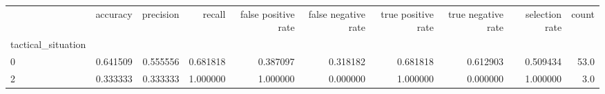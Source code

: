 \begin{tabular}{lrrrrrrrrr}
\toprule
{} &  accuracy &  precision &    recall &  false positive rate &  false negative rate &  true positive rate &  true negative rate &  selection rate &  count \\
tactical\_situation &           &            &           &                      &                      &                     &                     &                 &        \\
\midrule
0                  &  0.641509 &   0.555556 &  0.681818 &             0.387097 &             0.318182 &            0.681818 &            0.612903 &        0.509434 &   53.0 \\
2                  &  0.333333 &   0.333333 &  1.000000 &             1.000000 &             0.000000 &            1.000000 &            0.000000 &        1.000000 &    3.0 \\
\bottomrule
\end{tabular}
